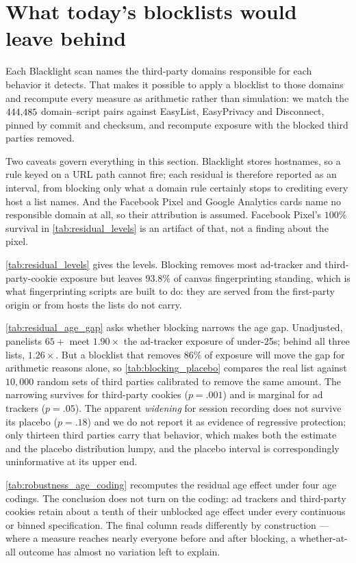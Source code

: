 \documentclass[12pt, letterpaper]{article}
\begin{document}
\clearpage
\FloatBarrier
\section{What today's blocklists would leave behind}
\label{sm:blocking}

Each Blacklight scan names the third-party domains responsible for each behavior
it detects. That makes it possible to apply a blocklist to those domains and
recompute every measure as arithmetic rather than simulation: we match the
$444{,}485$ domain--script pairs against EasyList, EasyPrivacy and Disconnect,
pinned by commit and checksum, and recompute exposure with the blocked third
parties removed.

Two caveats govern everything in this section. Blacklight stores hostnames, so a
rule keyed on a URL path cannot fire; each residual is therefore reported as an
interval, from blocking only what a domain rule certainly stops to crediting
every host a list names. And the Facebook Pixel and Google Analytics cards name
no responsible domain at all, so their attribution is assumed. Facebook Pixel's
$100\%$ survival in \cref{tab:residual_levels} is an artifact of that, not a
finding about the pixel.

\cref{tab:residual_levels} gives the levels. Blocking removes most ad-tracker and
third-party-cookie exposure but leaves $93.8\%$ of canvas fingerprinting
standing, which is what fingerprinting scripts are built to do: they are served
from the first-party origin or from hosts the lists do not carry.

\cref{tab:residual_age_gap} asks whether blocking narrows the age gap. Unadjusted,
panelists $65+$ meet $1.90\times$ the ad-tracker exposure of under-25s; behind
all three lists, $1.26\times$. But a blocklist that removes $86\%$ of exposure
will move the gap for arithmetic reasons alone, so \cref{tab:blocking_placebo}
compares the real list against $10{,}000$ random sets of third parties calibrated
to remove the same amount. The narrowing survives for third-party cookies
($p = .001$) and is marginal for ad trackers ($p = .05$). The apparent
\textit{widening} for session recording does not survive its placebo
($p = .18$) and we do not report it as evidence of regressive protection; only
thirteen third parties carry that behavior, which makes both the estimate and
the placebo distribution lumpy, and the placebo interval is correspondingly
uninformative at its upper end.

\cref{tab:robustness_age_coding} recomputes the residual age effect under four
age codings. The conclusion does not turn on the coding: ad trackers and
third-party cookies retain about a tenth of their unblocked age effect under
every continuous or binned specification. The final column reads differently by
construction --- where a measure reaches nearly everyone before and after
blocking, a whether-at-all outcome has almost no variation left to explain.
\end{document}
